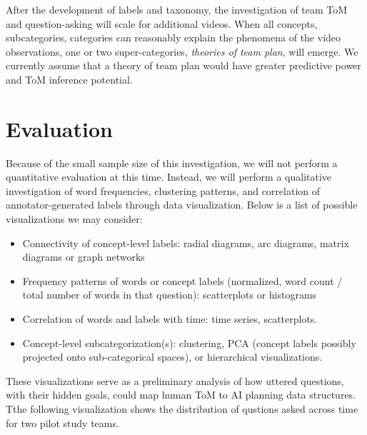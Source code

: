 After the development of labels and taxonomy, the investigation of team ToM and
question-asking will scale for additional videos. When all concepts,
subcategories, categories can reasonably explain the phenomena of the video
observations, one or two super-categories, \emph{theories of team plan}, will
emerge. We currently assume that a theory of team plan would have greater
predictive power and ToM inference potential. 


\section{Evaluation}

Because of the small sample size of this investigation, we will not perform a
quantitative evaluation at this time. Instead, we will perform a qualitative
investigation of word frequencies, clustering patterns, and correlation of
annotator-generated labels through data visualization. Below is a list of
possible visualizations we may consider:

\begin{itemize}

    \item Connectivity of concept-level labels: radial diagrams, arc diagrams,
        matrix diagrams or graph networks

    \item Frequency patterns of words or concept labels (normalized, word count
        / total number of words in that question): scatterplots or histograms

    \item Correlation of words and labels with time: time series, scatterplots. 

    \item Concept-level subcategorization(s): clustering, PCA (concept labels
        possibly projected onto sub-categorical spaces), or hierarchical
        visualizations.

\end{itemize}


These visualizations serve as a preliminary analysis of how uttered
questions, with their hidden goals, could map human ToM to AI planning data
structures. Tthe following visualization shows the distribution of
qustions asked across time for two pilot study teams. 


